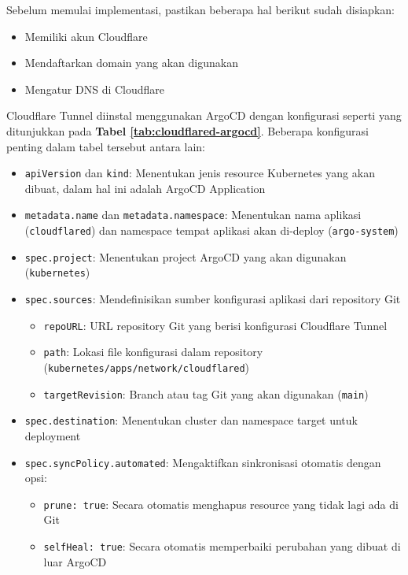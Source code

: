 Sebelum memulai implementasi, pastikan beberapa hal berikut sudah disiapkan:
\begin{itemize}
  \item Memiliki akun Cloudflare
  \item Mendaftarkan domain yang akan digunakan
  \item Mengatur DNS di Cloudflare
\end{itemize}

Cloudflare Tunnel diinstal menggunakan ArgoCD dengan konfigurasi seperti yang
ditunjukkan pada \textbf{Tabel \ref{tab:cloudflared-argocd}}. Beberapa
konfigurasi penting dalam tabel tersebut antara lain:

\begin{itemize}
  \item \texttt{apiVersion} dan \texttt{kind}: Menentukan jenis resource Kubernetes yang akan dibuat, dalam hal ini adalah ArgoCD Application
  \item \texttt{metadata.name} dan \texttt{metadata.namespace}: Menentukan nama aplikasi (\texttt{cloudflared}) dan namespace tempat aplikasi akan di-deploy (\texttt{argo-system})
  \item \texttt{spec.project}: Menentukan project ArgoCD yang akan digunakan (\texttt{kubernetes})
  \item \texttt{spec.sources}: Mendefinisikan sumber konfigurasi aplikasi dari repository Git
        \begin{itemize}
          \item \texttt{repoURL}: URL repository Git yang berisi konfigurasi Cloudflare Tunnel
          \item \texttt{path}: Lokasi file konfigurasi dalam repository (\texttt{kubernetes/apps/network/cloudflared})
          \item \texttt{targetRevision}: Branch atau tag Git yang akan digunakan (\texttt{main})
        \end{itemize}
  \item \texttt{spec.destination}: Menentukan cluster dan namespace target untuk deployment
  \item \texttt{spec.syncPolicy.automated}: Mengaktifkan sinkronisasi otomatis dengan opsi:
        \begin{itemize}
          \item \texttt{prune: true}: Secara otomatis menghapus resource yang tidak lagi ada di Git
          \item \texttt{selfHeal: true}: Secara otomatis memperbaiki perubahan yang dibuat di luar ArgoCD
        \end{itemize}
\end{itemize}

